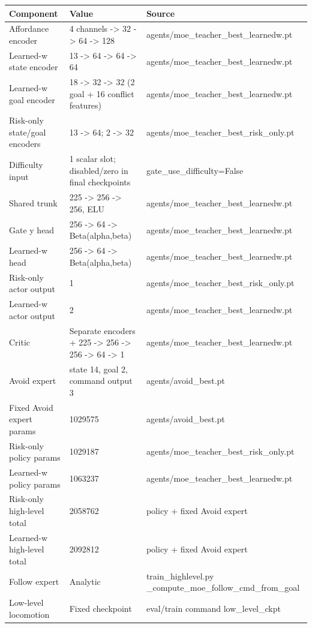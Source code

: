 \begin{tabular}{lll}
\toprule
Component & Value & Source \\
\midrule
Affordance encoder & 4 channels -> 32 -> 64 -> 128 & agents/moe\_teacher\_best\_learnedw.pt \\
Learned-w state encoder & 13 -> 64 -> 64 -> 64 & agents/moe\_teacher\_best\_learnedw.pt \\
Learned-w goal encoder & 18 -> 32 -> 32 (2 goal + 16 conflict features) & agents/moe\_teacher\_best\_learnedw.pt \\
Risk-only state/goal encoders & 13 -> 64; 2 -> 32 & agents/moe\_teacher\_best\_risk\_only.pt \\
Difficulty input & 1 scalar slot; disabled/zero in final checkpoints & gate\_use\_difficulty=False \\
Shared trunk & 225 -> 256 -> 256, ELU & agents/moe\_teacher\_best\_learnedw.pt \\
Gate y head & 256 -> 64 -> Beta(alpha,beta) & agents/moe\_teacher\_best\_learnedw.pt \\
Learned-w head & 256 -> 64 -> Beta(alpha,beta) & agents/moe\_teacher\_best\_learnedw.pt \\
Risk-only actor output & 1 & agents/moe\_teacher\_best\_risk\_only.pt \\
Learned-w actor output & 2 & agents/moe\_teacher\_best\_learnedw.pt \\
Critic & Separate encoders + 225 -> 256 -> 256 -> 64 -> 1 & agents/moe\_teacher\_best\_learnedw.pt \\
Avoid expert & state 14, goal 2, command output 3 & agents/avoid\_best.pt \\
Fixed Avoid expert params & 1029575 & agents/avoid\_best.pt \\
Risk-only policy params & 1029187 & agents/moe\_teacher\_best\_risk\_only.pt \\
Learned-w policy params & 1063237 & agents/moe\_teacher\_best\_learnedw.pt \\
Risk-only high-level total & 2058762 & policy + fixed Avoid expert \\
Learned-w high-level total & 2092812 & policy + fixed Avoid expert \\
Follow expert & Analytic & train\_highlevel.py \_compute\_moe\_follow\_cmd\_from\_goal \\
Low-level locomotion & Fixed checkpoint & eval/train command low\_level\_ckpt \\
\bottomrule
\end{tabular}
